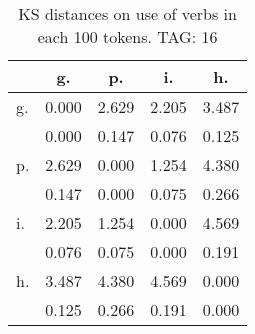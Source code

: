 \begin{table}[h!]
\begin{center}
\begin{tabular}{| l | c | c | c | c |}\hline
 & g. & p. & i. & h. \\\hline
g. & 0.000  & 2.629  & 2.205  & 3.487 \\\hline
 & 0.000  & 0.147  & 0.076  & 0.125 \\\hline
p. & 2.629  & 0.000  & 1.254  & 4.380 \\\hline
 & 0.147  & 0.000  & 0.075  & 0.266 \\\hline
i. & 2.205  & 1.254  & 0.000  & 4.569 \\\hline
 & 0.076  & 0.075  & 0.000  & 0.191 \\\hline
h. & 3.487  & 4.380  & 4.569  & 0.000 \\\hline
 & 0.125  & 0.266  & 0.191  & 0.000 \\\hline
\end{tabular}
\caption{KS distances on use of verbs in each 100 tokens. TAG: 16}
\end{center}
\end{table}